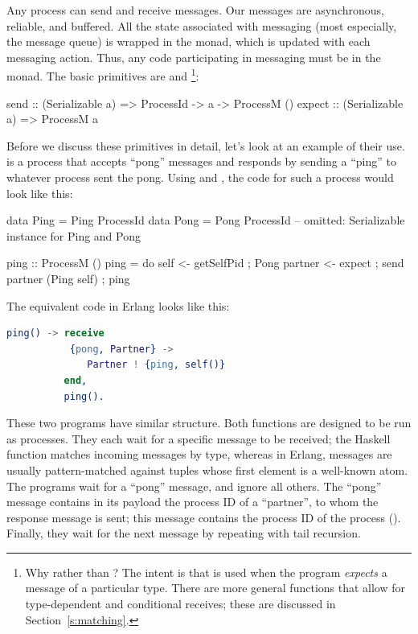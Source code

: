\documentclass[preprint]{sigplanconf}
\begin{document}
Any process can send and receive messages. Our messages are asynchronous, reliable, and buffered.  All the state associated with messaging (most especially, the message queue) is wrapped in the  monad, which is updated with each messaging action. Thus, any code participating in messaging must be in the  monad.  The basic primitives are  and \footnote{Why  rather than ?  The intent is that  is used when the program \emph{expects} a message of a particular type.  
There are more general  functions that allow for type-dependent and conditional receives;  these are discussed in Section~\ref{s:matching}.}:

\par{\small
\begin{code}
send :: (Serializable a) => ProcessId -> a 
						-> ProcessM ()
expect :: (Serializable a) => ProcessM a
\end{code}}
\noindent

Before we discuss these primitives in detail, let's look at an example of their use.
 is a process that accepts ``pong'' messages and responds by sending a ``ping'' to whatever process sent the pong. Using  and , the code for such a process would look like this:

\begin{code}
data Ping = Ping ProcessId
data Pong = Pong ProcessId
-- omitted: Serializable instance for Ping and Pong

ping :: ProcessM ()
ping = do { self <- getSelfPid
          ; Pong partner <- expect
          ; send partner (Ping self)
          ; ping }
\end{code}

\noindent The equivalent code in Erlang looks like this:

\begin{lstlisting}[language=Erlang]
ping() -> receive
           {pong, Partner} -> 
              Partner ! {ping, self()}
          end,
          ping().               
\end{lstlisting}

These two programs have similar structure. Both  functions are designed to be run as processes. They each wait for a specific message to be received; the Haskell  function matches incoming messages by type, whereas in Erlang, messages are usually pattern-matched against tuples whose first element is a well-known atom. The programs wait for a ``pong'' message, and ignore all others. The ``pong'' message contains in its payload the process ID of a ``partner'', to whom the response message is sent; this message contains the process ID of the  process (). Finally, they wait for the next message by repeating with tail recursion.
\end{document}
